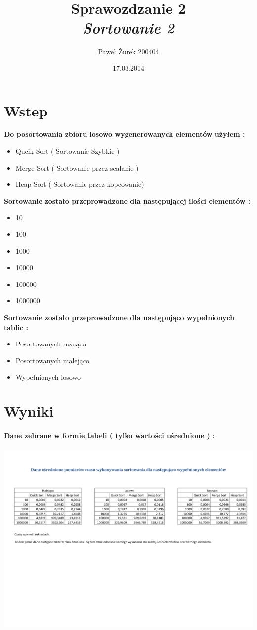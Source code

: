 \documentclass[10 pt]{article}
\title{Sprawozdzanie 2 \\ \emph{ \textbf{ Sortowanie 2}}}
\author{Paweł Żurek 200404}
\date{17.03.2014}
\begin{document}
\tableofcontents
\maketitle
\section{Wstep}
\textbf{Do posortowania zbioru losowo wygenerowanych elementów użyłem : }
\begin{itemize}
\item Qucik Sort ( Sortowanie Szybkie )
\item Merge Sort ( Sortowanie przez scalanie )
\item Heap Sort ( Sortowanie przez kopcowanie)
\end{itemize}
\textbf{Sortowanie zostało przeprowadzone dla następującej ilości elementów : }
\begin{itemize}
\item 10
\item 100
\item 1000
\item 10000
\item 100000
\item 1000000
\end{itemize}
\textbf{Sortowanie zostało przeprowadzone dla następująco wypełnionych tablic : }
\begin{itemize}
\item Posortowanych rosnąco
\item Posortowanych malejąco
\item Wypełnionych losowo
\end{itemize}

\section{Wyniki}

\paragraph{Dane zebrane w formie tabeli ( tylko wartości uśrednione ) : \\}
\begin{center}
\includegraphics[scale=0.5]{DaneUsrednione.pdf}
\end{center}
\newpage
\end{document}
